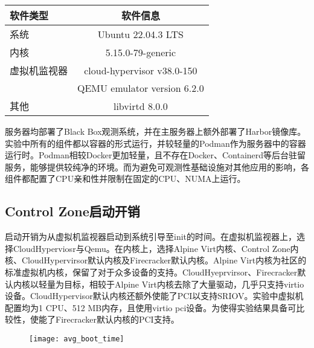 \begin{table}[H]
    \label{tab:system_env}
    \footnotesize%
    \setlength{\tabcolsep}{30pt}%
    \renewcommand{\arraystretch}{1.25}%
    \centering
    \begin{tabular}{lc}
        \hline
        软件类型 & 软件信息 \\
        \hline
        系统 & Ubuntu 22.04.3 LTS  \\
        内核 & 5.15.0-79-generic \\
        虚拟机监视器 & cloud-hypervisor v38.0-150 \\
                   & QEMU emulator version 6.2.0 \\
        其他        & libvirtd 8.0.0 \\
        \hline
    \end{tabular}
\end{table}

服务器均部署了Black Box观测系统，并在主服务器上额外部署了Harbor镜像库。实验中所有的组件都以容器的形式运行，并较轻量的Podman作为服务器中的容器运行时。Podman相较Docker更加轻量，且不存在Docker、Containerd等后台驻留服务，能够提供较纯净的环境。而为避免可观测性基础设施对其他应用的影响，各组件都配置了CPU亲和性并限制在固定的CPU、NUMA上运行。

\subsection{Control Zone启动开销}

启动开销为从虚拟机监视器启动到系统引导至init的时间。在虚拟机监视器上，选择CloudHyperviosr与Qemu。在内核上，选择Alpine Virt内核、Control Zone内核、CloudHypervirsor默认内核及Firecracker默认内核。Alpine Virt内核为社区的标准虚拟机内核，保留了对于众多设备的支持。CloudHyeprvirsor、Firecracker默认内核以轻量为目标，相较于Alpine Virt内核去除了大量驱动，几乎只支持virtio设备。CloudHypervisor默认内核还额外使能了PCI以支持SRIOV。实验中虚拟机配置均为1 CPU、512 MB内存，且使用virtio pci设备。为使得实验结果具备可比较性，使能了Firecracker默认内核的PCI支持。

\begin{figure}[H]
    \centering
    \texttt{[image: avg\_boot\_time]}
    \label{fig:avg_boot_time}
\end{figure}

